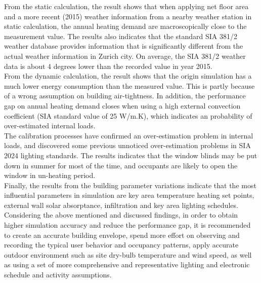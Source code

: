 \documentclass[a4paper, oneside]{discothesis}
\begin{document}
    From the static calculation, the result shows that when applying net floor area and a more recent (2015) weather information from a nearby weather station in static calculation, the annual heating demand are macroscopically close to the measurement value. The results also indicates that the standard SIA 381/2 weather database provides information that is significantly different from the actual weather information in Zurich city. On average, the SIA 381/2 weather data is about 4 degrees lower than the recorded value in year 2015.\\

    From the dynamic calculation, the result shows that the origin simulation has a much lower energy consumption than the measured value. This is partly because of a wrong assumption on building air-tightness. In addition, the performance gap on annual heating demand closes when using a high external convection coefficient (SIA standard value of 25 W/m.K), which indicates an probability of over-estimated internal loads.\\

    The calibration processes have confirmed an over-estimation problem in internal loads, and discovered some previous unnoticed over-estimation problems in SIA 2024 lighting standards. The results indicates that the window blinds may be put down in summer for most of the time, and occupants are likely to open the window in un-heating period.\\

    Finally, the results from the building parameter variations indicate that the most influential parameters in simulation are key area temperature heating set points, external wall solar absorptance, infiltration and key area lighting schedules.\\

    Considering the above mentioned and discussed findings, in order to obtain higher simulation accuracy and reduce the performance gap, it is recommended to create an accurate building envelope, spend more effort on observing and recording the typical user behavior and occupancy patterns, apply accurate outdoor environment such as site dry-bulb temperature and wind speed, as well as using a set of more comprehensive and representative lighting and electronic schedule and activity assumptions.







\end{document}
